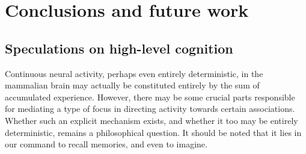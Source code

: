 
\chapter{Conclusions and future work}

\section{Speculations on high-level cognition}
Continuous neural activity, perhaps even entirely deterministic, in the mammalian brain may actually be constituted entirely by the sum of accumulated experience. However, there may be some crucial parts responsible for mediating a type of focus in directing activity towards certain associations. Whether such an explicit mechanism exists, and whether it too may be entirely deterministic, remains a philosophical question. It should be noted that it lies in our command to recall memories, and even to imagine.

\cleardoublepage
